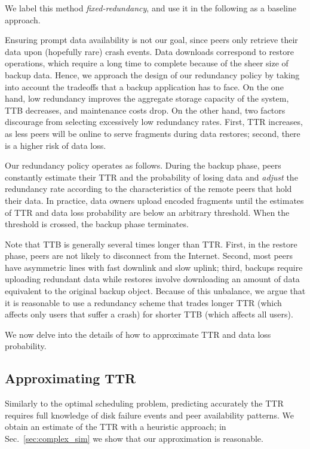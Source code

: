 \documentclass[conference,10pt]{IEEEtran}
\begin{document}
We label this method \emph{fixed-redundancy}, and use it in the following as a baseline approach.

Ensuring prompt data availability is not our goal, since peers only retrieve their data upon (hopefully rare) crash events. Data downloads correspond to restore operations, which require a long time to complete because of the sheer size of backup data.
Hence, we approach the design of our redundancy policy by taking into account the tradeoffs that a backup application has to face. On the one hand, low redundancy improves the aggregate storage capacity of the system, TTB decreases, and maintenance costs drop. On the other hand, two factors discourage from selecting excessively low redundancy rates. First, TTR increases, as less peers will be online to serve fragments during data restores; second, there is a higher risk of data loss.

Our redundancy policy operates as follows. During the backup phase, peers constantly estimate their TTR and the probability of losing data and \emph{adjust} the redundancy rate according to the characteristics of the remote peers that hold their data. In practice, data owners upload encoded fragments until the estimates of TTR and data loss probability are below an arbitrary threshold. When the threshold is crossed, the backup phase terminates.

Note that TTB is generally several times longer than TTR. First, in the restore phase, peers are not likely to disconnect from the Internet. Second, most peers have asymmetric lines with fast downlink and slow uplink; third, backups require uploading redundant data while restores involve downloading an amount of data equivalent to the original backup object. Because of this unbalance, we argue that it is reasonable to use a redundancy scheme that trades longer TTR (which affects only users that suffer a crash) for shorter TTB (which affects all users).

We now delve into the details of how to approximate TTR and data loss probability.

\subsection{Approximating TTR}

Similarly to the optimal scheduling problem, predicting accurately the TTR requires full knowledge of disk failure events and peer availability patterns. We obtain an estimate of the TTR with a heuristic approach; in Sec.~\ref{sec:complex_sim} we show that our approximation is reasonable.
\end{document}
